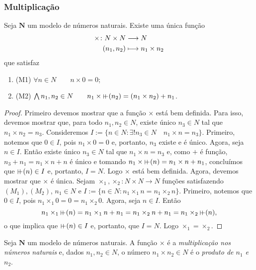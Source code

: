 \subsubsection{Multiplicação}

\begin{theorem}
	Seja $\bm N$ um modelo de números naturais. Existe uma única função
	\begin{align*}
	{\times}\colon {N \times N} &\longrightarrow {N} \\{(n_1,n_2)} &\longmapsto n_1 \times n_2
	\end{align*}
que satisfaz
	\begin{enumerate}
	\item (M1) $\forall n \in N \qquad n \times 0 = 0$;
	\item (M2) $\forall n_1,n_2 \in N \qquad n_1 \times \suce(n_2) = (n_1 \times n_2) + n_1$.
	\end{enumerate}
\end{theorem}
\begin{proof}
	Primeiro devemos mostrar que a função $\times$ está bem definida. Para isso, devemos mostrar que, para todo $n_1,n_2 \in N$, existe único $n_3 \in N$ tal que $n_1 \times n_2=n_3$. Consideremos $I := \{n \in N : \exists! n_3 \in N \quad n_1 \times n = n_3\}$. Primeiro, notemos que $0 \in I$, pois $n_1 \times 0 = 0$ e, portanto, $n_3$ existe e é único. Agora, seja $n \in I$. Então existe único $n_3 \in N$ tal que $n_1 \times n = n_3$ e, como $+$ é função, $n_3 + n_1=n_1 \times n + n$ é único e tomando $n_1 \times \suce(n)=n_1 \times n + n_1$, concluímos que $\suce(n) \in I$ e, portanto, $I=N$. Logo $\times$ está bem definida. Agora, devemos mostrar que $\times$ é única. Sejam $\times_1,\times_2: N \times N \to N$ funções satisfazendo $(M_1),(M_2)$, $n_1 \in N$ e $I := \{n \in N : n_1 \times_1 n = n_1 \times_2 n\}$. Primeiro, notemos que $0 \in I$, pois $n_1 \times_1 0 = 0 = n_1 \times_2 0$. Agora, seja $n \in I$. Então
	\begin{equation*}
	n_1 \times_1 \suce(n) = n_1 \times_1 n + n_1 = n_1 \times_2 n + n_1 = n_1 \times_2 \suce(n),
	\end{equation*}
o que implica que $\suce(n) \in I$ e, portanto, que $I=N$. Logo $\times_1=\times_2$.
\end{proof}

\begin{definition}
	Seja $\bm N$ um modelo de números naturais. A função $\times$ é a \emph{multiplicação nos números naturais} e, dados $n_1,n_2 \in N$, o número $n_1 \times n_2 \in N$ é o \emph{produto de $n_1$ e $n_2$}.
\end{definition}

